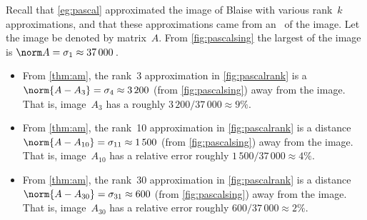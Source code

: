 \begin{example} 
Recall that \cref{eg:pascal} approximated the image of Blaise  with various rank~\(k\) approximations, and that
these approximations came from an \svd\ of the image.
Let the image be denoted by matrix~\(A\).
From \cref{fig:pascalsing} the largest  of the image is \(\norm A=\sigma_1\approx37\,000\)\,.
\begin{itemize}
\item From  \cref{thm:am}, the rank~3 approximation in \cref{fig:pascalrank} is a  \(\norm{A-A_3}=\sigma_4\approx 3\,200\) (from \cref{fig:pascalsing}) away from the image.  
That is, image~\(A_3\) has a  roughly \(3\,200/37\,000\approx 9\%\).
\item From  \cref{thm:am}, the rank~10 approximation in \cref{fig:pascalrank} is a distance \(\norm{A-A_{10}}=\sigma_{11}\approx 1\,500\) (from \cref{fig:pascalsing}) away from the image.  
That is, image~\(A_{10}\) has a relative error roughly \(1\,500/37\,000 \approx 4\%\). 
\item From  \cref{thm:am}, the rank~30 approximation in \cref{fig:pascalrank} is a distance \(\norm{A-A_{30}}=\sigma_{31}\approx 600\) (from \cref{fig:pascalsing}) away from the image.  
That is, image~\(A_{30}\) has a relative error roughly \(600/37\,000 \approx 2\%\). 
\end{itemize}
\end{example}


